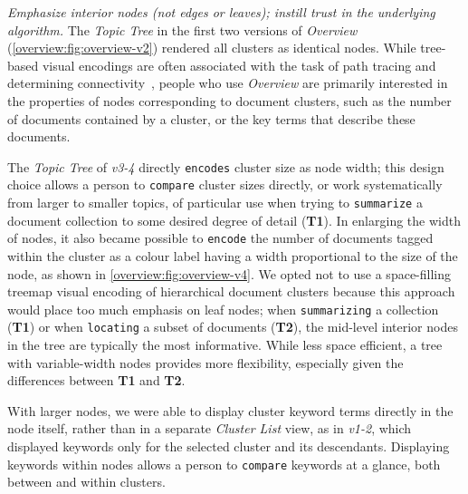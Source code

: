 {\it Emphasize interior nodes (not edges or leaves); instill trust in the underlying algorithm.}
The {\it Topic Tree} in the first two versions of {\it Overview} (\autoref{overview:fig:overview-v2}) rendered all clusters as identical nodes.
While tree-based visual encodings are often associated with the task of path tracing and determining connectivity~\cite{Lee2006}, people who use {\it Overview} are primarily interested in the properties of nodes corresponding to document clusters, such as the number of documents contained by a cluster, or the key terms that describe these documents.

The {\it Topic Tree} of {\it v3-4} directly {\tt encodes} cluster size as node width; this design choice allows a person to {\tt compare} cluster sizes directly, or work systematically from larger to smaller topics, of particular use when trying to {\tt summarize} a document collection to some desired degree of detail ({\bf T1}).
In enlarging the width of nodes, it also became possible to {\tt encode} the number of documents tagged within the cluster as a colour label having a width proportional to the size of the node, as shown in \autoref{overview:fig:overview-v4}.
We opted not to use a space-filling treemap visual encoding of hierarchical document clusters because this approach would place too much emphasis on leaf nodes; when {\tt summarizing} a collection ({\bf T1}) or when {\tt locating} a subset of documents ({\bf T2}), the mid-level interior nodes in the tree are typically the most informative.
While less space efficient, a tree with variable-width nodes provides more flexibility, especially given the differences between {\bf T1} and {\bf T2}.

With larger nodes, we were able to display cluster keyword terms directly in the node itself, rather than in a separate {\it Cluster List} view, as in {\it v1-2}, which displayed keywords only for the selected cluster and its descendants.
Displaying keywords within nodes allows a person to {\tt compare} keywords at a glance, both between and within clusters.

